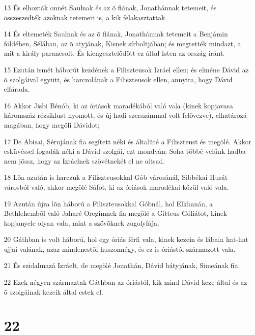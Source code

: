 \par 13 És elhozták onnét Saulnak és az õ fiának, Jonathánnak tetemeit, és összeszedték azoknak tetemeit is,  a kik felakasztattak.
\par 14 És eltemeték Saulnak és az õ fiának, Jonathánnak tetemeit a Benjámin földében, Sélában, az õ atyjának, Kisnek sírboltjában; és megtették mindazt, a mit a király parancsolt. És kiengesztelõdött ez által Isten az ország iránt.
\par 15 Ezután ismét háborút kezdének a Filiszteusok Izráel ellen; és elméne Dávid az õ szolgáival együtt, és harczolának a Filiszteusok ellen, annyira, hogy Dávid elfárada.
\par 16 Akkor Jisbi Bénób, ki az óriások maradékából való vala (kinek kopjavasa háromszáz rézsiklust nyomott, és új hadi szerszámmal volt felövezve), elhatározá magában, hogy megöli Dávidot;
\par 17 De Abisai, Sérujának fia segített néki és általüté a Filiszteust és megölé. Akkor esküvéssel fogadák néki a Dávid szolgái, ezt mondván: Soha többé velünk hadba nem jössz, hogy az Izráelnek szövétnekét el ne oltsad.
\par 18 Lõn azután is harczuk a Filiszteusokkal Gób városánál, Sibbékai Husát városból való, akkor megölé Sáfot, ki az óriások maradékai közül való vala.
\par 19 Azután újra lõn háború a Filiszteusokkal Góbnál, hol Elkhanán, a Bethlehembõl való Jaharé Oregimnek fia megölé a Gitteus Góliátot, kinek kopjanyele olyan vala, mint a szövõknek zugolyfája.
\par 20 Gáthban is volt háború, hol egy óriás férfi vala, kinek kezein és lábain hat-hat ujjai valának, azaz mindenestõl huszonnégy, és ez is óriástól származott vala.
\par 21 És szidalmazá Izráelt, de megölé Jonathán, Dávid bátyjának, Simeának fia.
\par 22 Ezek négyen származtak Gáthban az óriástól, kik mind Dávid keze által és az õ szolgáinak kezeik által estek el.

\chapter{22}

